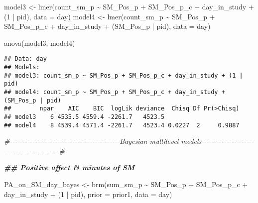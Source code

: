 \documentclass[
]{article}
\newenvironment{Shaded}{\begin{snugshade}}{\end{snugshade}}
\newcommand{\AttributeTok}[1]{\textcolor[rgb]{0.77,0.63,0.00}{#1}}
\newcommand{\CommentTok}[1]{\textcolor[rgb]{0.56,0.35,0.01}{\textit{#1}}}
\newcommand{\DecValTok}[1]{\textcolor[rgb]{0.00,0.00,0.81}{#1}}
\newcommand{\DocumentationTok}[1]{\textcolor[rgb]{0.56,0.35,0.01}{\textbf{\textit{#1}}}}
\newcommand{\FunctionTok}[1]{\textcolor[rgb]{0.00,0.00,0.00}{#1}}
\newcommand{\NormalTok}[1]{#1}
\newcommand{\OtherTok}[1]{\textcolor[rgb]{0.56,0.35,0.01}{#1}}
\newcommand{\SpecialCharTok}[1]{\textcolor[rgb]{0.00,0.00,0.00}{#1}}
\begin{document}
\begin{Shaded}
\begin{Highlighting}[]
\NormalTok{model3 }\OtherTok{\textless{}{-}} \FunctionTok{lmer}\NormalTok{(count\_sm\_p }\SpecialCharTok{\textasciitilde{}}\NormalTok{ SM\_Pos\_p }\SpecialCharTok{+}\NormalTok{ SM\_Pos\_p\_c }\SpecialCharTok{+}\NormalTok{ day\_in\_study }\SpecialCharTok{+}\NormalTok{ (}\DecValTok{1} \SpecialCharTok{|}\NormalTok{ pid), }\AttributeTok{data =}\NormalTok{ day)}
\NormalTok{model4 }\OtherTok{\textless{}{-}} \FunctionTok{lmer}\NormalTok{(count\_sm\_p }\SpecialCharTok{\textasciitilde{}}\NormalTok{ SM\_Pos\_p }\SpecialCharTok{+}\NormalTok{ SM\_Pos\_p\_c }\SpecialCharTok{+}\NormalTok{ day\_in\_study }\SpecialCharTok{+}\NormalTok{ (SM\_Pos\_p }\SpecialCharTok{|}\NormalTok{ pid), }\AttributeTok{data =}\NormalTok{ day)}

\FunctionTok{anova}\NormalTok{(model3, model4)}
\end{Highlighting}
\end{Shaded}

\begin{verbatim}
## Data: day
## Models:
## model3: count_sm_p ~ SM_Pos_p + SM_Pos_p_c + day_in_study + (1 | pid)
## model4: count_sm_p ~ SM_Pos_p + SM_Pos_p_c + day_in_study + (SM_Pos_p | pid)
##        npar    AIC    BIC  logLik deviance  Chisq Df Pr(>Chisq)
## model3    6 4535.5 4559.4 -2261.7   4523.5                     
## model4    8 4539.4 4571.4 -2261.7   4523.4 0.0227  2     0.9887
\end{verbatim}

\begin{Shaded}
\begin{Highlighting}[]
\CommentTok{\#{-}{-}{-}{-}{-}{-}{-}{-}{-}{-}{-}{-}{-}{-}{-}{-}{-}{-}{-}{-}{-}{-}{-}{-}{-}{-}{-}{-}{-}{-}{-}{-}{-}{-}{-}{-}{-}{-}{-}{-}{-}{-}{-}{-}Bayesian multilevel models{-}{-}{-}{-}{-}{-}{-}{-}{-}{-}{-}{-}{-}{-}{-}{-}{-}{-}{-}{-}{-}{-}{-}{-}{-}{-}{-}{-}{-}{-}{-}{-}{-}{-}{-}{-}{-}{-}{-}{-}{-}{-}{-}\#}

\DocumentationTok{\#\# Positive affect \& minutes of SM}

\NormalTok{PA\_on\_SM\_day\_bayes  }\OtherTok{\textless{}{-}} \FunctionTok{brm}\NormalTok{(sum\_sm\_p }\SpecialCharTok{\textasciitilde{}}\NormalTok{ SM\_Pos\_p }\SpecialCharTok{+}\NormalTok{ SM\_Pos\_p\_c }\SpecialCharTok{+}\NormalTok{ day\_in\_study }\SpecialCharTok{+}\NormalTok{ (}\DecValTok{1} \SpecialCharTok{|}\NormalTok{ pid), }\AttributeTok{prior =}\NormalTok{ prior1, }\AttributeTok{data =}\NormalTok{ day)}
\end{Highlighting}
\end{Shaded}
\end{document}
